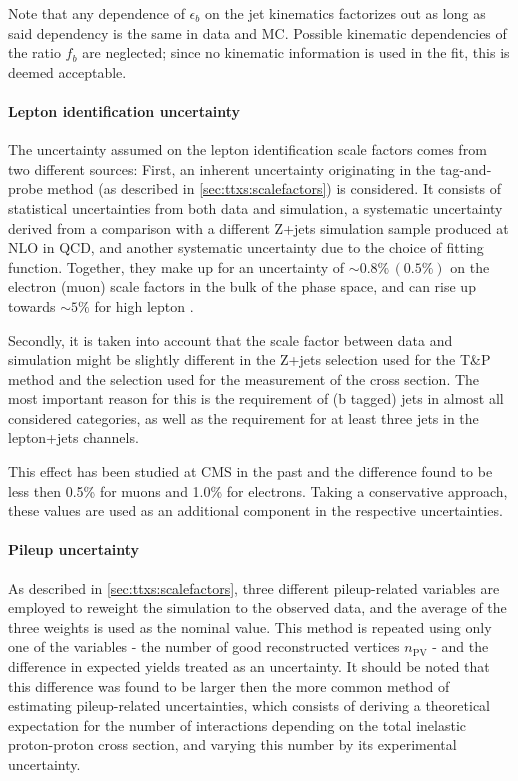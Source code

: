 Note that any dependence of $\epsilon_b$ on the jet kinematics factorizes out as long as said dependency is the same in data and MC. Possible kinematic dependencies of the ratio $f_b$ are neglected; since no kinematic information is used in the fit, this is deemed acceptable.

\paragraph{Lepton identification uncertainty}


The uncertainty assumed on the lepton identification scale factors comes from two different sources: First, an inherent uncertainty originating in the tag-and-probe method (as described in \cref{sec:ttxs:scalefactors}) is considered. It consists of statistical uncertainties from both data and simulation, a systematic uncertainty derived from a comparison with a different Z+jets simulation sample produced at NLO in QCD, and another systematic uncertainty due to the choice of fitting function. Together, they make up for an uncertainty of $\sim 0.8\% \, (0.5\%)$ on the electron (muon) scale factors in the bulk of the phase space, and can rise up towards $\sim 5\%$ for high lepton \pt.

Secondly, it is taken into account that the scale factor between data and simulation might be slightly different in the Z+jets selection used for the T\&P method and the \ttbar selection used for the measurement of the cross section. The most important reason for this is the requirement of (b tagged) jets in almost all considered categories, as well as the requirement for at least three jets in the lepton+jets channels. 

This effect has been studied at CMS in the past and the difference found to be less then 0.5\% for muons and 1.0\% for electrons. Taking a conservative approach, these values are used as an additional component in the respective uncertainties.

\paragraph{Pileup uncertainty}

As described in \cref{sec:ttxs:scalefactors}, three different pileup-related variables are employed to reweight the simulation to the observed data, and the average of the three weights is used as the nominal value. This method is repeated using only one of the variables - the number of good reconstructed vertices $n_{\mathrm{PV}}$ - and the difference in expected yields treated as an uncertainty. It should be noted that this difference was found to be larger then the more common method of estimating pileup-related uncertainties, which consists of deriving a theoretical expectation for the number of interactions depending on the total inelastic proton-proton cross section, and varying this number by its experimental uncertainty.

